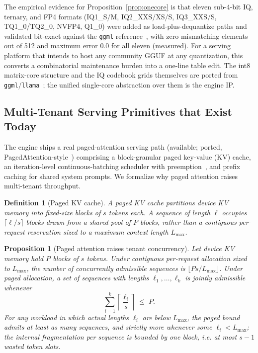 \documentclass[11pt]{article}
\newtheorem{proposition}{Proposition}
\newtheorem{definition}{Definition}
\begin{document}
The empirical evidence for Proposition~\ref{prop:onecore} is that eleven sub-4-bit IQ, ternary, and FP4 formats (IQ1\_S/M, IQ2\_XXS/XS/S, IQ3\_XXS/S, TQ1\_0/TQ2\_0, NVFP4, Q1\_0) were added as load-plus-dequantize paths and validated bit-exact against the \texttt{ggml} reference~\cite{ggml}, with zero mismatching elements out of 512 and maximum error 0.0 for all eleven (measured). For a serving platform that intends to host any community GGUF at any quantization, this converts a combinatorial maintenance burden into a one-line table edit. The int8 matrix-core structure and the IQ codebook grids themselves are ported from \texttt{ggml}/\texttt{llama}~\cite{ggml}; the unified single-core abstraction over them is the engine IP.

\subsection{Multi-Tenant Serving Primitives that Exist Today}

The engine ships a real paged-attention serving path (available; ported, PagedAttention-style~\cite{kwon2023}) comprising a block-granular paged key-value (KV) cache, an iteration-level continuous-batching scheduler with preemption~\cite{yu2022}, and prefix caching for shared system prompts. We formalize why paged attention raises multi-tenant throughput.

\begin{definition}[Paged KV cache]
A \emph{paged KV cache} partitions device KV memory into fixed-size blocks of $s$ tokens each. A sequence of length $\ell$ occupies $\lceil \ell/s \rceil$ blocks drawn from a shared pool of $P$ blocks, rather than a contiguous per-request reservation sized to a maximum context length $L_{\max}$.
\end{definition}

\begin{proposition}[Paged attention raises tenant concurrency]
\label{prop:paged}
Let device KV memory hold $P$ blocks of $s$ tokens. Under contiguous per-request allocation sized to $L_{\max}$, the number of concurrently admissible sequences is $\lfloor P s / L_{\max} \rfloor$. Under paged allocation, a set of sequences with lengths $\ell_1,\dots,\ell_k$ is jointly admissible whenever
\begin{equation}
\label{eq:paged}
\sum_{i=1}^{k} \left\lceil \frac{\ell_i}{s} \right\rceil \;\le\; P .
\end{equation}
For any workload in which actual lengths $\ell_i$ are below $L_{\max}$, the paged bound admits at least as many sequences, and strictly more whenever some $\ell_i < L_{\max}$; the internal fragmentation per sequence is bounded by one block, i.e. at most $s-1$ wasted token slots.
\end{proposition}
\end{document}
